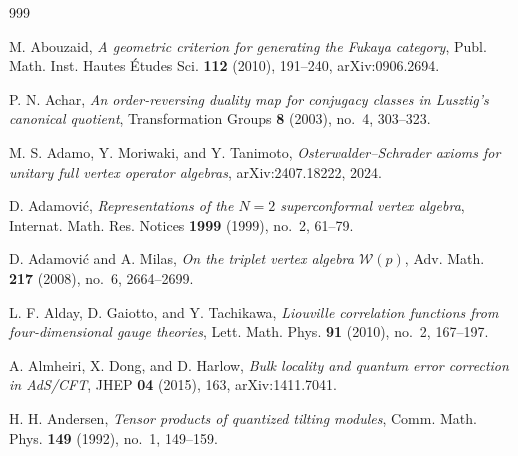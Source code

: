 \begin{thebibliography}{999}

%

M. Abouzaid, \emph{A geometric criterion for generating the {F}ukaya category}, Publ. Math. Inst. Hautes \'Etudes Sci. \textbf{112} (2010), 191--240, arXiv:0906.2694.

P. N. Achar, \emph{An order-reversing duality map for conjugacy classes in Lusztig's canonical quotient}, Transformation Groups \textbf{8} (2003), no.~4, 303--323.

M. S. Adamo, Y. Moriwaki, and Y. Tanimoto, \emph{Osterwalder--Schrader axioms for unitary full vertex operator algebras}, arXiv:2407.18222, 2024.

D. Adamovi\'c, \emph{Representations of the $N = 2$ superconformal vertex algebra}, Internat. Math. Res. Notices \textbf{1999} (1999), no.~2, 61--79.

D. Adamovi\'c and A. Milas, \emph{On the triplet vertex algebra $\mathcal{W}(p)$}, Adv. Math. \textbf{217} (2008), no.~6, 2664--2699.

L. F. Alday, D. Gaiotto, and Y. Tachikawa, \emph{Liouville correlation functions from four-dimensional gauge theories}, Lett. Math. Phys. \textbf{91} (2010), no.~2, 167--197.

A. Almheiri, X. Dong, and D. Harlow, \emph{Bulk locality and quantum error correction in AdS/CFT}, JHEP \textbf{04} (2015), 163, arXiv:1411.7041.

H. H. Andersen, \emph{Tensor products of quantized tilting modules}, Comm. Math. Phys. \textbf{149} (1992), no.~1, 149--159.


\end{thebibliography}
